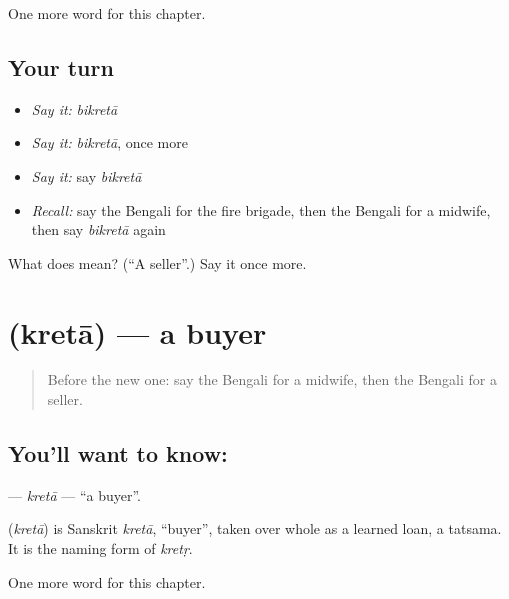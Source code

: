 \begin{grammarlens}[title={What you've built}]
One more word for this chapter.
\end{grammarlens}

\subsection*{Your turn}
\begin{itemize}
\raggedright
  \item \emph{Say it:} \emph{bikretā}
  \item \emph{Say it:} \emph{bikretā}, once more
  \item \emph{Say it:} say \emph{bikretā}
  \item \emph{Recall:} say the Bengali for the fire brigade, then the Bengali for a midwife, then say \emph{bikretā} again
\end{itemize}

\begin{tcolorbox}[breakable,colback=teal!4,colframe=teal!35!black,title={Before you move on}]
What does  mean? (\textquotedblleft{}A seller\textquotedblright{}.) Say it once more.
\end{tcolorbox}
\section[\texorpdfstring{\bn{ক্রেতা} (kretā)}{ক্রেতা (kretā)}]{ (kretā) — a buyer}

\label{lesson:BN-C178-kreta}



\begin{quote}
Before the new one: say the Bengali for a midwife, then the Bengali for a seller.
\end{quote}

\subsection*{You'll want to know: }
\textbf{} — \emph{kretā} — \textquotedblleft{}a buyer\textquotedblright{}.

\begin{cousinweb}
\textbf{} (\emph{kretā}) is Sanskrit \emph{kretā}, \textquotedblleft{}buyer\textquotedblright{}, taken over whole as a learned loan, a tatsama. It is the naming form of \emph{kretṛ}.
\end{cousinweb}

\begin{grammarlens}[title={What you've built}]
One more word for this chapter.
\end{grammarlens}

